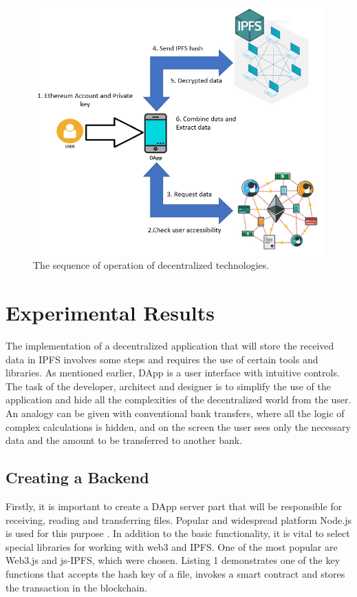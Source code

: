 \documentclass[10pt,conference,a4paper]{IEEEtran_EDM}
\begin{document}
\begin{figure}[htb!]
\centerline{\includegraphics[scale=0.67]{fig2.png}}
\caption{The sequence of operation of decentralized technologies.}
\label{Sequence}
\end{figure}

\section{Experimental Results}
The implementation of a decentralized application that will store the received data in IPFS involves some steps and requires the use of certain tools and libraries.
As mentioned earlier, DApp is a user interface with intuitive controls.
The task of the developer, architect and designer is to simplify the use of the application and hide all the complexities of the decentralized world from the user.
An analogy can be given with conventional bank transfers, where all the logic of complex calculations is hidden, and on the screen the user sees only the necessary data and the amount to be transferred to another bank.

\subsection{Creating a Backend}
Firstly, it is important to create a DApp server part that will be responsible for receiving, reading and transferring files.
Popular and widespread platform Node.js is used for this purpose \cite{Herron}.
In addition to the basic functionality, it is vital to select special libraries for working with web3 and IPFS.
One of the most popular are Web3.js and js-IPFS, which were chosen.
Listing 1 demonstrates one of the key functions that accepts the hash key of a file, invokes a smart contract and stores the transaction in the blockchain.
\end{document}
